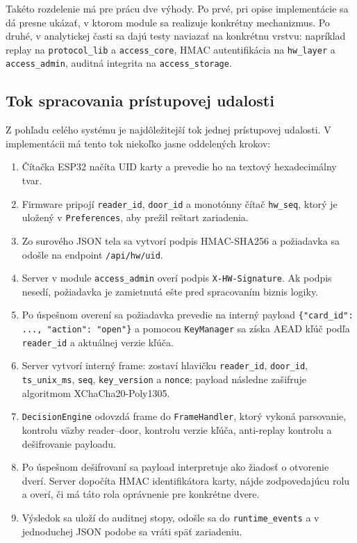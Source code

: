 \documentclass[journal,a4paper,onecolumn]{IEEEtran}
\begin{document}
Takéto rozdelenie má pre prácu dve výhody. Po prvé, pri opise implementácie sa dá presne ukázať, v ktorom module sa realizuje konkrétny mechanizmus. Po druhé, v analytickej časti sa dajú testy naviazať na konkrétnu vrstvu: napríklad replay na \texttt{protocol\_lib} a \texttt{access\_core}, HMAC autentifikácia na \texttt{hw\_layer} a \texttt{access\_admin}, auditná integrita na \texttt{access\_storage}.

\subsection{Tok spracovania prístupovej udalosti}

Z pohľadu celého systému je najdôležitejší tok jednej prístupovej udalosti. V implementácii má tento tok niekoľko jasne oddelených krokov:

\begin{enumerate}[leftmargin=*,itemsep=3pt]
  \item Čítačka ESP32 načíta UID karty a prevedie ho na textový hexadecimálny tvar.
  \item Firmware pripojí \texttt{reader\_id}, \texttt{door\_id} a monotónny čítač \texttt{hw\_seq}, ktorý je uložený v \texttt{Preferences}, aby prežil reštart zariadenia.
  \item Zo surového JSON tela sa vytvorí podpis HMAC-SHA256 a požiadavka sa odošle na endpoint \texttt{/api/hw/uid}.
  \item Server v module \texttt{access\_admin} overí podpis \texttt{X-HW-Signature}. Ak podpis nesedí, požiadavka je zamietnutá ešte pred spracovaním biznis logiky.
  \item Po úspešnom overení sa požiadavka prevedie na interný payload \texttt{\{"card\_id": ..., "action": "open"\}} a pomocou \texttt{KeyManager} sa získa AEAD kľúč podľa \texttt{reader\_id} a aktuálnej verzie kľúča.
  \item Server vytvorí interný frame: zostaví hlavičku \texttt{reader\_id}, \texttt{door\_id}, \texttt{ts\_unix\_ms}, \texttt{seq}, \texttt{key\_version} a \texttt{nonce}; payload následne zašifruje algoritmom XChaCha20-Poly1305.
  \item \texttt{DecisionEngine} odovzdá frame do \texttt{FrameHandler}, ktorý vykoná parsovanie, kontrolu väzby reader--door, kontrolu verzie kľúča, anti-replay kontrolu a dešifrovanie payloadu.
  \item Po úspešnom dešifrovaní sa payload interpretuje ako žiadosť o otvorenie dverí. Server dopočíta HMAC identifikátora karty, nájde zodpovedajúcu rolu a overí, či má táto rola oprávnenie pre konkrétne dvere.
  \item Výsledok sa uloží do auditnej stopy, odošle sa do \texttt{runtime\_events} a v jednoduchej JSON podobe sa vráti späť zariadeniu.
\end{enumerate}
\end{document}
